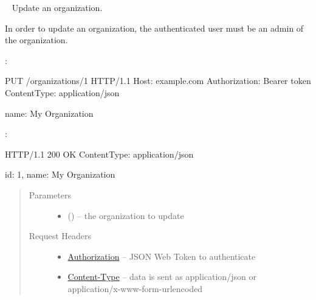 \documentclass[letterpaper,10pt,english]{sphinxmanual}
\begin{document}
\begin{DUlineblock}{0em}
\item[] 
\end{DUlineblock}


\begin{fulllineitems}
\label{\detokenize{resources/organization:put--organizations-(organization_id)}}~
Update an organization.

In order to update an organization, the authenticated user must be an
admin of the organization.

:

\begin{sphinxVerbatim}[commandchars=\\\{\}]
PUT /organizations/1 HTTP/1.1
Host: example.com
Authorization: Bearer \PYGZlt{}token\PYGZgt{}
Content\PYGZhy{}Type: application/json

\PYGZob{}
    \PYGZsq{}name\PYGZsq{}: \PYGZsq{}My Organization\PYGZsq{}
\PYGZcb{}
\end{sphinxVerbatim}

:

\begin{sphinxVerbatim}[commandchars=\\\{\}]
HTTP/1.1 200 OK
Content\PYGZhy{}Type: application/json

\PYGZob{}
    \PYGZsq{}id\PYGZsq{}: 1,
    \PYGZsq{}name\PYGZsq{}: \PYGZsq{}My Organization\PYGZsq{}
\PYGZcb{}
\end{sphinxVerbatim}
\begin{quote}\begin{description}
\item[{Parameters}] \leavevmode\begin{itemize}
\item {} 
 () -- the organization to update

\end{itemize}

\item[{Request Headers}] \leavevmode\begin{itemize}
\item {} 
\href{http://tools.ietf.org/html/rfc7235\#section-4.2}{Authorization} -- JSON Web Token to authenticate

\item {} 
\href{http://tools.ietf.org/html/rfc7231\#section-3.1.1.5}{Content-Type} -- data is sent as application/json or
application/x-www-form-urlencoded


\end{itemize}
\end{description}
\end{quote}
\end{fulllineitems}
\end{document}
